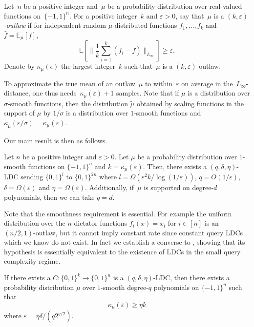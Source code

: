 \documentclass{toc}
\newcommand{\bset}[1]{\{0,1\}^{#1}} %
\newcommand{\pmset}[1]{\{-1,1\}^{#1}} %
\newcommand{\sBC}{{\{-1,1\}}}
\newcommand{\Exp}{{\mathbb{E}}}
\newcommand{\eps}{\varepsilon}
\newcommand{\beqn}{\begin{equation*}}
\newcommand{\eeqn}{\end{equation*}}
\begin{document}
\begin{definition}[Outlaw]\label{def:outlaw}
Let~$n$ be a positive integer and~$\mu$ be a probability distribution over real-valued functions on~$\pmset{n}$.
For a positive integer~$k$ and ${\eps > 0}$, say that~$\mu$ is a $(k, \eps)$-\emph{outlaw} if
for independent random $\mu$-distributed functions $f_1,\dots,f_{k}$ and $\bar f = \Exp_\mu[f]$,
\beqn
\Exp\left[\Big\|\frac{1}{k}\sum_{i=1}^k (f_i - \bar f)\Big\|_{L_\infty}\right] \geq \eps.
\eeqn
Denote by $\kappa_\mu(\epsilon)$ the largest integer~$k$ such that~$\mu$ is a $(k,\eps)$-outlaw.
\end{definition}

To approximate the true mean of an outlaw~$\mu$ to within~$\eps$ on average in the~$L_\infty$-distance, one thus needs~$\kappa_\mu(\eps)+1$ samples. Note that if $\mu$ is a distribution over $\sigma$-smooth functions, then the distribution $\tilde{\mu}$ obtained by scaling functions in the support of $\mu$ by $1/\sigma$ is a distribution over $1$-smooth functions and $\kappa_{\tilde{\mu}}(\eps/\sigma)=\kappa_{\mu}(\eps)$.

Our main result is then as follows.

\begin{theorem}\label{thm:main}
Let $n$ be a positive integer and $\eps >0 $.
Let $\mu$ be a probability distribution over $1$-smooth functions on $\pmset{n}$ and $k = \kappa_\mu(\eps)$.
Then, there exists a $(q,\delta,\eta)$-LDC sending $\bset{l}$ to $\bset{2n}$ where $l=\Omega(\eps^2 k/\log(1/\eps))$, $q=O(1/\eps)$, $\delta =\Omega(\eps)$ and $\eta=\Omega(\eps)$.
Additionally, if~$\mu$ is supported on degree-$d$ polynomials, then we can take $q=d$.
\end{theorem}

Note that the smoothness requirement is essential. For example the uniform distribution over the $n$ dictator functions $f_i(x)=x_i$ for $i\in [n]$ is an $(n/2,1)$-outlaw, but it cannot imply constant rate since constant query LDCs which we know do not exist. In fact we establish a converse to , showing that its hypothesis is essentially equivalent to the existence of LDCs in the small query complexity regime.

\begin{theorem}\label{thm:main_converse}
If there exists a $C:\bset{k}\to \bset{n}$ is a $(q,\delta, \eta)$-LDC, then there exists a probability distribution $\mu$ over $1$-smooth degree-$q$ polynomials on $\sBC^n$ such that $$\kappa_\mu(\eps)\ge \eta k$$ where $\eps=\eta\delta/(q2^{q/2})$.
\end{theorem}
\end{document}
